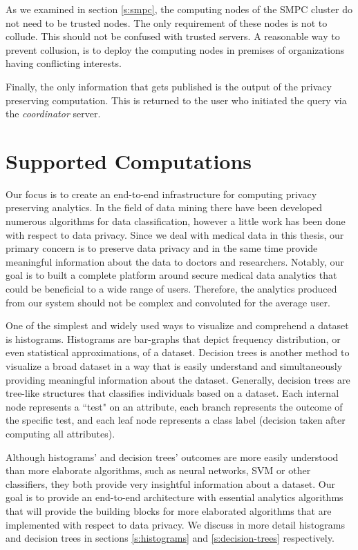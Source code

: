 As we examined in section \ref{s:smpc}, the computing nodes of the SMPC cluster do not need to be trusted nodes.
The only requirement of these nodes is not to collude.
This should not be confused with trusted servers.
A reasonable way to prevent collusion, is to deploy the computing nodes in premises of organizations having conflicting interests.

Finally, the only information that gets published is the output of the privacy preserving computation.
This is returned to the user who initiated the query via the \textit{coordinator} server.



\section{Supported Computations}\label{s:computations}
Our focus is to create an end-to-end infrastructure for computing privacy preserving analytics.
In the field of data mining there have been developed numerous algorithms for data classification, however a little work has been done with respect to data privacy.
Since we deal with medical data in this thesis, our primary concern is to preserve data privacy and in the same time provide meaningful information about the data to doctors and researchers.
Notably, our goal is to built a complete platform around secure medical data analytics that could be beneficial to a wide range of users.
Therefore, the analytics produced from our system should not be complex and convoluted for the average user.

One of the simplest and widely used ways to visualize and comprehend a dataset is histograms.
Histograms are bar-graphs that depict frequency distribution, or even statistical approximations, of a dataset.
Decision trees is another method to visualize a broad dataset in a way that is easily understand and simultaneously providing meaningful information about the dataset.
Generally, decision trees are tree-like structures that classifies individuals based on a dataset.
Each internal node represents a ``test" on an attribute, each branch represents the outcome of the specific test, and each leaf node represents a class label (decision taken after computing all attributes).

Although histograms' and decision trees' outcomes are more easily understood than more elaborate algorithms, such as neural networks, SVM or other classifiers, they both provide very insightful information about a dataset.
Our goal is to provide an end-to-end architecture with essential analytics algorithms that will provide the building blocks for more elaborated algorithms that are implemented with respect to data privacy.
We discuss in more detail histograms and decision trees in sections \ref{s:histograms} and \ref{s:decision-trees} respectively.


